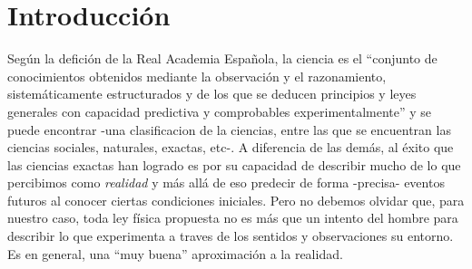 \documentclass[11pt]{book}
\begin{document}
\newpage

\addtolength{\topmargin}{\MSup}



\tableofcontents
\cleardoublepage




\chapter{Introducción}


Según la defición de la Real Academia Española, la ciencia es el ``conjunto de conocimientos obtenidos mediante la observación y el razonamiento, sistemáticamente estructurados y de los que se deducen principios y leyes generales con capacidad predictiva y comprobables experimentalmente'' y se puede encontrar -una clasificacion de la ciencias, entre las que se encuentran las ciencias sociales, naturales, exactas, etc-. %
A diferencia de las demás, al éxito que las ciencias exactas han logrado es por su capacidad de describir mucho de lo que percibimos como \emph{realidad} y más allá de eso predecir de forma -precisa- eventos futuros al conocer ciertas condiciones iniciales. %
 Pero no debemos olvidar que, para nuestro caso, toda ley física propuesta no es más que un intento del hombre para describir lo que experimenta a traves de los sentidos y observaciones su entorno. Es en general, una ``muy buena'' aproximación a la realidad.
\end{document}
